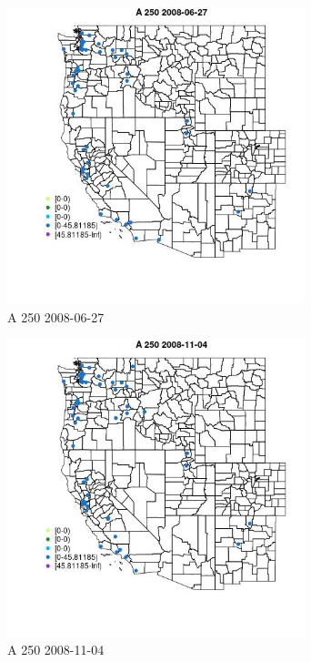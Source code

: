 \begin{figure} 
\centering  
\includegraphics[width=0.77\textwidth]{Code_Outputs/Report_ML_input_PM25_Step4_part_e_de_duplicated_aves_MapObsA_2502008-06-27.jpg} 
\caption{\label{fig:Report_ML_input_PM25_Step4_part_e_de_duplicated_avesMapObsA_2502008-06-27}A 250 2008-06-27} 
\end{figure} 
 

\begin{figure} 
\centering  
\includegraphics[width=0.77\textwidth]{Code_Outputs/Report_ML_input_PM25_Step4_part_e_de_duplicated_aves_MapObsA_2502008-11-04.jpg} 
\caption{\label{fig:Report_ML_input_PM25_Step4_part_e_de_duplicated_avesMapObsA_2502008-11-04}A 250 2008-11-04} 
\end{figure} 
 

